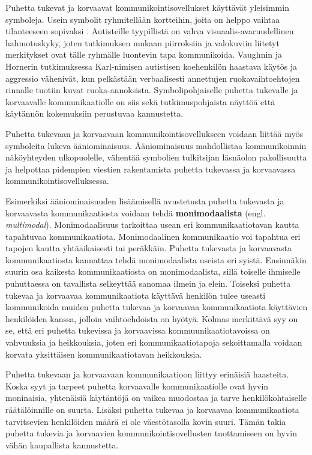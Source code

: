 \documentclass[utf8]{gradu3}
\begin{document}
\label{AAC-symbols}
Puhetta tukevat ja korvaavat kommunikointisovellukset käyttävät yleisimmin symboleja. Usein symbolit ryhmitellään kortteihin, joita on helppo vaihtaa tilanteeseen sopivaksi \label{AAC-cards}. Autisteille tyypillistä on vahva visuaalis-avaruudellinen hahmotuskyky, joten tutkimuksen mukaan piirroksiin ja valokuviin liitetyt merkitykset ovat tälle ryhmälle luontevin tapa kommunikoida. Vaughnin ja Hornerin tutkimuksessa \parencite[]{concrete-versus-verbal} Karl-nimisen autistisen koehenkilön haastava käytös ja aggressio vähenivät, kun pelkästään verbaalisesti annettujen ruokavaihtoehtojen rinnalle tuotiin kuvat ruoka-annoksista. Symbolipohjaiselle puhetta tukevalle ja korvaavalle kommunikaatiolle on siis sekä tutkimuspohjaista näyttöä että käytännön kokemuksiin perustuvaa kannustetta.

Puhetta tukevaan ja korvaavaan kommunikointisovellukseen voidaan liittää myös symboleita lukeva ääniominaisuus. Ääniominaisuus mahdollistaa kommunikoinnin näköyhteyden ulkopuolelle, vähentää symbolien tulkitsijan läsnäolon pakollisuutta ja helpottaa pidempien viestien rakentamista puhetta tukevassa ja korvaavassa kommunikointisovelluksessa. \parencite[]{AAC-interventions}

Esimerkiksi ääniominaisuuden lisäämisellä avustetusta puhetta tukevasta ja korvaavasta kommunikaatiosta voidaan tehdä \textbf{monimodaalista} (engl. \textit{multimodal}). Monimodaalisuus tarkoittaa usean eri kommunikaatiotavan kautta tapahtuvaa kommunikaatiota. Monimodaalinen kommunikaatio voi tapahtua eri tapojen kautta yhtäaikaisesti tai peräkkäin. Puhetta tukevasta ja korvaavasta kommunikaatiosta kannattaa tehdä monimodaalista useista eri syistä. Ensinnäkin suurin osa kaikesta kommunikaatiosta on monimodaalista, sillä toiselle ihmiselle puhuttaessa on tavallista selkeyttää sanomaa ilmein ja elein. Toiseksi puhetta tukevaa ja korvaavaa kommunikaatiota käyttävä henkilön tulee useasti kommunikoida muiden puhetta tukevaa ja korvaavaa kommunikaatiota käyttävien henkilöiden kanssa, jolloin vaihtoehdoista on hyötyä. Kolmas merkittävä syy on se, että eri puhetta tukevissa ja korvaavissa kommuunikaatiotavoissa on vahvuuksia ja heikkouksia, joten eri kommunikaatiotapoja sekoittamalla voidaan korvata yksittäisen kommunikaatiotavan heikkouksia. \parencite[]{AAC-conditional-use}

Puhetta tukevaan ja korvaavaan kommunikaatioon liittyy erinäisiä haasteita. Koska syyt ja tarpeet puhetta korvaavalle kommunikaatiolle ovat hyvin moninaisia, yhtenäisiä käytäntöjä on vaikea muodostaa ja tarve henkilökohtaiselle räätälöinnille on suurta. Lisäksi puhetta tukevaa ja korvaavaa kommunikaatiota tarvitsevien henkilöiden määrä ei ole väestötasolla kovin suuri. Tämän takia puhetta tukevia ja korvaavien kommunikointisovellusten tuottamiseen on hyvin vähän kaupallista kannustetta.
\end{document}
